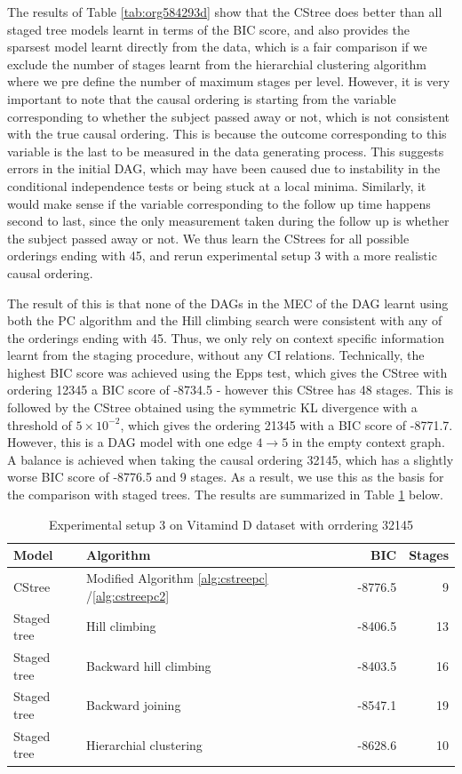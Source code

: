 \documentclass{tufte-book}
\begin{document}
The results of Table \ref{tab:org584293d} show that the CStree does better than all staged tree models learnt in terms of the BIC score, and also provides the sparsest model learnt directly from the data, which is a fair comparison if we exclude the number of stages learnt from the hierarchial clustering algorithm where we pre define the number of maximum stages per level. However, it is very important to note that the causal ordering is starting from the variable corresponding to whether the subject passed away or not, which is not consistent with the true causal ordering. This is because the outcome corresponding to this variable is the last to be measured in the data generating process. This suggests errors in the initial DAG, which may have been caused due to instability in the conditional independence tests or being stuck at a local minima. Similarly, it would make sense if the variable corresponding to the follow up time happens second to last, since the only measurement taken during the follow up is whether the subject passed away or not. We thus learn the CStrees for all possible orderings ending with 45, and rerun experimental setup 3 with a more realistic causal ordering.

The result of this is that none of the DAGs in the MEC of the DAG learnt using both the PC algorithm and the Hill climbing search were consistent with any of the orderings ending with 45. Thus, we only rely on context specific information learnt from the staging procedure, without any CI relations. Technically, the highest BIC score was achieved using the Epps test, which gives the CStree with ordering 12345 a BIC score of -8734.5 - however this CStree has 48 stages. This is followed by the CStree obtained using the symmetric KL divergence with a threshold of \(5 \times 10^{-2}\), which gives the ordering 21345 with a BIC score of -8771.7. However, this is a DAG model with one edge \(4 \rightarrow 5\) in the empty context graph. A balance is achieved when taking the causal ordering 32145, which has a slightly worse BIC score of -8776.5 and 9 stages. As a result, we use this as the basis for the comparison with staged trees. The results are summarized in Table \ref{tab:org835eb83} below.


\begin{table}[htbp]
\caption{\label{tab:org835eb83}Experimental setup 3 on Vitamind D dataset with orrdering 32145}
\centering
\begin{tabular}{l|l|r|r}
\hline
Model & Algorithm & BIC & Stages\\
\hline
CStree & Modified Algorithm \ref{alg:cstreepc} /\ref{alg:cstreepc2} & -8776.5 & 9\\
Staged tree & Hill climbing & -8406.5 & 13\\
Staged tree & Backward hill climbing & -8403.5 & 16\\
Staged tree & Backward joining & -8547.1 & 19\\
Staged tree & Hierarchial clustering & -8628.6 & 10\\
\end{tabular}
\end{table}
\end{document}
